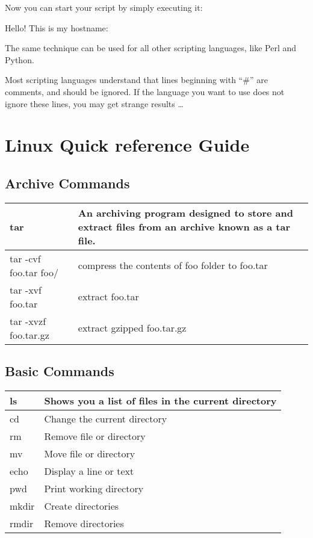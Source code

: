 Now you can start your script by simply executing it:

\begin{prompt}
Hello! This is my hostname:
\end{prompt}

The same technique can be used for all other scripting languages, like Perl and Python.

Most scripting languages understand that lines beginning with ``\#'' are
comments, and should be ignored. If the language you want to use does not
ignore these lines, you may get strange results \ldots

\section{Linux Quick reference Guide}

\subsection{Archive Commands}

\begin{tabular}{|p{}|p{}|} \hline
tar                   & An archiving program designed to store and extract files from an archive known as a tar file.  \\ \hline
tar -cvf foo.tar foo/ & compress the contents of foo folder to foo.tar \\ \hline
tar -xvf foo.tar      & extract foo.tar \\ \hline
tar -xvzf foo.tar.gz  & extract gzipped foo.tar.gz \\ \hline
\end{tabular}


\subsection{Basic Commands}

\begin{tabular}{|p{}|p{}|} \hline
ls     & Shows you a list of files in the current directory \\ \hline
cd     & Change the current directory \\ \hline
rm     & Remove file or directory \\ \hline
mv     & Move file or directory \\ \hline
echo   & Display a line or text \\ \hline
pwd    & Print working directory \\ \hline
mkdir  & Create directories \\ \hline
rmdir  & Remove directories \\ \hline
\end{tabular}


